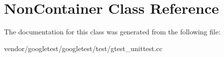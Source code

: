 \hypertarget{class_non_container}{}\section{Non\+Container Class Reference}
\label{class_non_container}


The documentation for this class was generated from the following file\+:\begin{DoxyCompactItemize}
\item 
vendor/googletest/googletest/test/gtest\+\_\+unittest.\+cc\end{DoxyCompactItemize}
